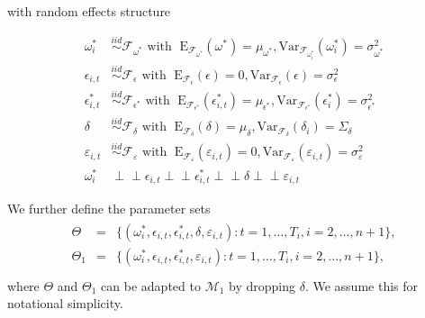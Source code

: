 \documentclass[11pt]{article}
\newcommand{\simiid}{\stackrel{iid}{\sim}} %
\newcommand{\indep}{\perp \!\!\! \perp } %
\def\mrm#1{\mathrm{#1}} %
\def\mc#1{\mathcal{#1}} %
\def\mc#1{\mathcal{#1}}
\theoremstyle{definition}
\begin{document}
  with random effects structure

  \begin{align*}
    \omega^{*}_i &\simiid \mc{F}_{\omega^{*}} \text{ with }  \; \mrm{E}_{\mc{F}_{\omega^{*}}}(\omega^{*}) = \mu_{\omega^{*}}, \mrm{Var}_{\mc{F}_{\omega^{*}_i}}(\omega^{*}_i)  = \sigma^2_{\omega^{*}}  \\
    \epsilon_{i,t} &\simiid \mc{F}_{\epsilon} \text{ with }  \; \mrm{E}_{\mc{F}_{\epsilon}}(\epsilon) = 0, \mrm{Var}_{\mc{F}_{\epsilon}}(\epsilon)  = \sigma^2_{\epsilon}  \\
    \epsilon^{*}_{i,t} &\simiid \mc{F}_{\epsilon^{*}} \text{ with }  \; \mrm{E}_{\mc{F}_{\epsilon^{*}}}(\epsilon^{*}_{i,t}) = \mu_{\epsilon^{*}}, \mrm{Var}_{\mc{F}_{\epsilon^{*}}}(\epsilon^{*}_i)  = \sigma^2_{\epsilon^{*}}  \\
    \delta &\simiid \mc{F}_{\delta} \text{ with }  \; \mrm{E}_{\mc{F}_{\delta}}(\delta) = \mu_{\delta}, \mrm{Var}_{\mc{F}_{\delta}}(\delta_i)  = \Sigma_{\delta} \\
    \varepsilon_{i,t} & \simiid  \mc{F}_{\varepsilon} \text{ with }  \; \mrm{E}_{\mc{F}_{\varepsilon}}(\varepsilon_{i,t}) = 0, \mrm{Var}_{\mc{F}_{\varepsilon}}(\varepsilon_{i,t}) = \sigma^2_{\varepsilon}\\
    \omega^{*}_i & \indep  \epsilon_{i,t} \indep  \epsilon^{*}_{i,t} \indep \delta \indep \varepsilon_{i,t}
    \end{align*}

    We further define the parameter sets
    \begin{align}
      \begin{array}{lll}
         \Theta &= &\{(\omega^{*}_i, \epsilon_{i,t}, \epsilon^{*}_{i,t}, \delta,\varepsilon_{i,t})\colon t= 1, \ldots, T_i, i = 2, \ldots, n +1\},\\
         \Theta_{1} &= &\{(\omega^{*}_i, \epsilon_{i,t}, \epsilon^{*}_{i,t}, \varepsilon_{i,t})\colon t= 1, \ldots, T_i, i = 2, \ldots, n +1\},\\
      \end{array}
    \end{align}\label{parameter}
    where $\Theta$ and $\Theta_1$ can be adapted to $\mc{M}_1$ by dropping $\delta$. We assume this for notational simplicity.
\end{document}
